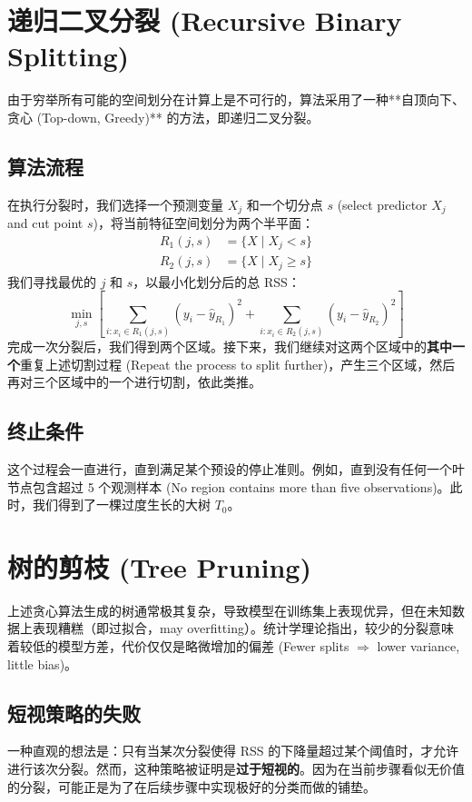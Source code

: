 \documentclass[UTF8]{ctexart}
\numberwithin{equation}{section}
\begin{document}
\section{递归二叉分裂 (Recursive Binary Splitting)}
由于穷举所有可能的空间划分在计算上是不可行的，算法采用了一种**自顶向下、贪心 (Top-down, Greedy)** 的方法，即递归二叉分裂。

\subsection{算法流程}
在执行分裂时，我们选择一个预测变量 $X_j$ 和一个切分点 $s$ (select predictor $X_j$ and cut point $s$)，将当前特征空间划分为两个半平面：
\begin{align*}
R_1(j,s) &= \{X \mid X_j < s\} \\
R_2(j,s) &= \{X \mid X_j \ge s\}
\end{align*}
我们寻找最优的 $j$ 和 $s$，以最小化划分后的总 RSS：
\begin{equation}
\min_{j,s} \left[ \sum_{i: x_i \in R_1(j,s)} (y_i - \hat{y}_{R_1})^2 + \sum_{i: x_i \in R_2(j,s)} (y_i - \hat{y}_{R_2})^2 \right]
\label{eq:split_rss}
\end{equation}
完成一次分裂后，我们得到两个区域。接下来，我们继续对这两个区域中的\textbf{其中一个}重复上述切割过程 (Repeat the process to split further)，产生三个区域，然后再对三个区域中的一个进行切割，依此类推。

\subsection{终止条件}
这个过程会一直进行，直到满足某个预设的停止准则。例如，直到没有任何一个叶节点包含超过 5 个观测样本 (No region contains more than five observations)。此时，我们得到了一棵过度生长的大树 $T_0$。

\section{树的剪枝 (Tree Pruning)}
上述贪心算法生成的树通常极其复杂，导致模型在训练集上表现优异，但在未知数据上表现糟糕（即过拟合，may overfitting）。统计学理论指出，较少的分裂意味着较低的模型方差，代价仅仅是略微增加的偏差 (Fewer splits $\Rightarrow$ lower variance, little bias)。

\subsection{短视策略的失败}
一种直观的想法是：只有当某次分裂使得 RSS 的下降量超过某个阈值时，才允许进行该次分裂。然而，这种策略被证明是\textbf{过于短视的}。因为在当前步骤看似无价值的分裂，可能正是为了在后续步骤中实现极好的分类而做的铺垫。
\end{document}
